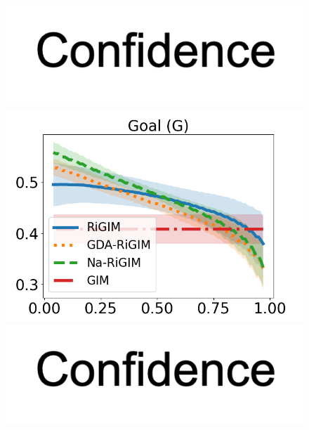 \documentclass{article}
\begin{document}
\begin{figure}[htbp]
\begin{minipage}{0.16\textwidth}
    \vspace{-0.05in}
    \includegraphics[scale=0.15]{figures/confidence_x_label.png}
    \end{minipage}
    \begin{minipage}{0.16\textwidth}
    \centering
    \includegraphics[scale=0.17]{figures/risk_curve_G_shadow.png}\par
    \vspace{-0.05in}
    \includegraphics[scale=0.15]{figures/confidence_x_label.png}
    \end{minipage}
    \begin{minipage}{0.16\textwidth}
    \centering

\end{minipage}
\end{figure}
\end{document}
